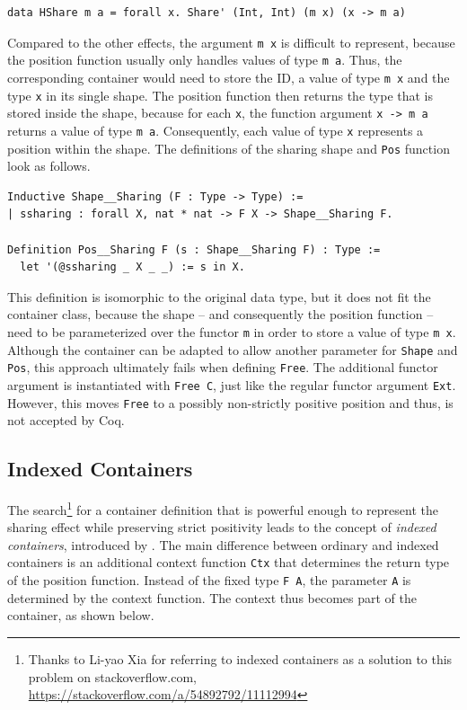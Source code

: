 \documentclass[a4paper, 11pt, fleqn, twoside, abstract=on]{scrreprt}
\newcommand{\hinl}[1]{\texttt{#1}}
\newcommand{\cinl}[1]{\texttt{#1}}
\begin{document}
\begin{verbatim}
data HShare m a = forall x. Share' (Int, Int) (m x) (x -> m a)
\end{verbatim}

Compared to the other effects, the argument \hinl{m x} is difficult to represent, because the position function usually only handles values of type \hinl{m a}.
Thus, the corresponding container would need to store the ID, a value of type \hinl{m x} and the type \hinl{x} in its single shape.
The position function then returns the type that is stored inside the shape, because for each \hinl{x}, the function argument \hinl{x -> m a} returns a value of type \hinl{m a}.
Consequently, each value of type \cinl{x} represents a position within the shape.
The definitions of the sharing shape and \cinl{Pos} function look as follows.

\begin{verbatim}
Inductive Shape__Sharing (F : Type -> Type) :=
| ssharing : forall X, nat * nat -> F X -> Shape__Sharing F.

Definition Pos__Sharing F (s : Shape__Sharing F) : Type :=
  let '(@ssharing _ X _ _) := s in X.
\end{verbatim}

This definition is isomorphic to the original data type, but it does not fit the container class, because the shape -- and consequently the position function -- need to be parameterized over the functor \hinl{m} in order to store a value of type \hinl{m x}.
Although the container can be adapted to allow another parameter for \cinl{Shape} and \cinl{Pos}, this approach ultimately fails when defining \cinl{Free}.
The additional functor argument is instantiated with \cinl{Free C}, just like the regular functor argument \cinl{Ext}.
However, this moves \cinl{Free} to a possibly non-strictly positive position and thus, is not accepted by Coq.

\subsection{Indexed Containers}
The search\footnote{Thanks to Li-yao Xia for referring to indexed containers as a solution to this problem on stackoverflow.com, \url{https://stackoverflow.com/a/54892792/11112994}} for a container definition that is powerful enough to represent the sharing effect while preserving strict positivity leads to the concept of \textit{indexed containers}, introduced by \citet{altenkirch2009indexed}. 
The main difference between ordinary and indexed containers is an additional context function \cinl{Ctx} that determines the return type of the position function.
Instead of the fixed type \hinl{F A}, the parameter \cinl{A} is determined by the context function.
The context thus becomes part of the container, as shown below.
\end{document}
